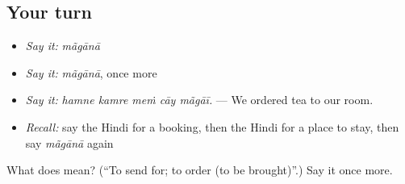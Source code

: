 \subsection*{Your turn}
\begin{itemize}
\raggedright
  \item \emph{Say it:} \emph{mãgānā}
  \item \emph{Say it:} \emph{mãgānā}, once more
  \item \emph{Say it:} \emph{hamne kamre meṁ cāy mãgāī.} — We ordered tea to our room.
  \item \emph{Recall:} say the Hindi for a booking, then the Hindi for a place to stay, then say \emph{mãgānā} again
\end{itemize}

\begin{tcolorbox}[breakable,colback=teal!4,colframe=teal!35!black,title={Before you move on}]
What does  mean? (\textquotedblleft{}To send for; to order (to be brought)\textquotedblright{}.) Say it once more.
\end{tcolorbox}
